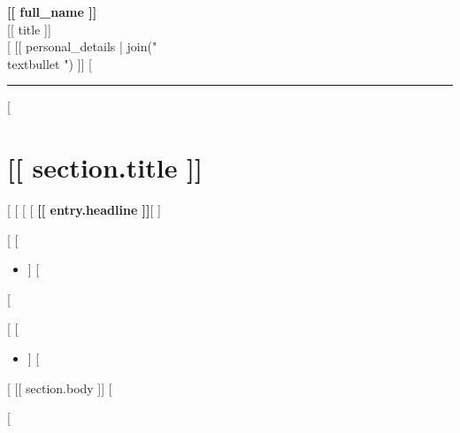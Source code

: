 \documentclass[11pt,a4paper]{article}
\begin{document}
{\LARGE \textbf{[[ full_name ]]}}\\[0.35em]
{\large [[ title ]]}\\[0.35em]
[%
[[ personal_details | join(" \\textbullet{} ") ]]
[%

\vspace{1.2em}
\hrule
\vspace{1.2em}

[%
\section*{[[ section.title ]]}
[%
[%
[%
[%
\textbf{[[ entry.headline ]]}[%
\nopagebreak
[%
[%
[[ entry.body ]]

[%
[%
\begin{itemize}
[%
  \item [[ highlight ]]
[%
\end{itemize}
[%

[%
[%
\begin{itemize}
[%
  \item [[ item ]]
[%
\end{itemize}
[%
[[ section.body ]]
[%

[%
\end{document}
